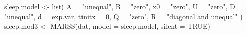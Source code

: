 \begin{Schunk}
\begin{Sinput}
 sleep.model <- list(
   A = "unequal", B = "zero", x0 = "zero", U = "zero",
   D = "unequal", d = exp.var, tinitx = 0, Q = "zero",
   R = "diagonal and unequal"
 )
 sleep.mod3 <- MARSS(dat, model = sleep.model, silent = TRUE)
\end{Sinput}
\end{Schunk}
